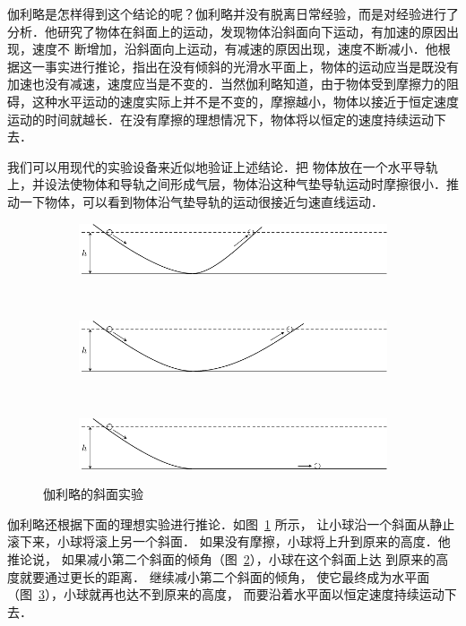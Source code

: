 伽利略是怎样得到这个结论的呢？伽利略并没有脱离日常经验，而是对经验进行了分析．他研究了物体在斜面上的运动，发现物体沿斜面向下运动，有加速的原因出现，速度不
断增加，沿斜面向上运动，有减速的原因出现，速度不断减小．他根据这一事实进行推论，指出在没有倾斜的光滑水平面上，物体的运动应当是既没有加速也没有减速，速度应当是不变的．当然伽利略知道，由于物体受到摩擦力的阻碍，这种水平运动的速度实际上并不是不变的，摩擦越小，物体以接近于恒定速度运动的时间就越长．在没有摩擦的理想情况下，物体将以恒定的速度持续运动下去．

我们可以用现代的实验设备来近似地验证上述结论．把
物体放在一个水平导轨上，并设法使物体和导轨之间形成气层，物体沿这种气垫导轨运动时摩擦很小．推动一下物体，可以看到物体沿气垫导轨的运动很接近匀速直线运动．

\begin{figure}[htp]
    \centering
    \begin{subfigure} {1\linewidth} 
		\centering
		\includegraphics{fig/A/3-1a.pdf} 
		\caption{}\label{fig_A_3-1a} 
	\end{subfigure}
	\\
	\begin{subfigure} {1\linewidth} 
		\centering
		\includegraphics{fig/A/3-1b.pdf} 
		\caption{}\label{fig_A_3-1b} 
	\end{subfigure}
	\\
	\begin{subfigure} {1\linewidth} 
		\centering
		\includegraphics{fig/A/3-1c.pdf} 
		\caption{}\label{fig_A_3-1c} 
	\end{subfigure}
    \caption{伽利略的斜面实验}\label{fig_A_3-1}
\end{figure}

伽利略还根据下面的理想实验进行推论．如图~\ref{fig_A_3-1a} 所示，
让小球沿一个斜面从静止滚下来，小球将滚上另一个斜面．
如果没有摩擦，小球将上升到原来的高度．他推论说，
如果减小第二个斜面的倾角（图~\ref{fig_A_3-1b}），小球在这个斜面上达
到原来的高度就要通过更长的距离．
继续减小第二个斜面的倾角，
使它最终成为水平面（图~\ref{fig_A_3-1c}），小球就再也达不到原来的高度，
而要沿着水平面以恒定速度持续运动下去．

